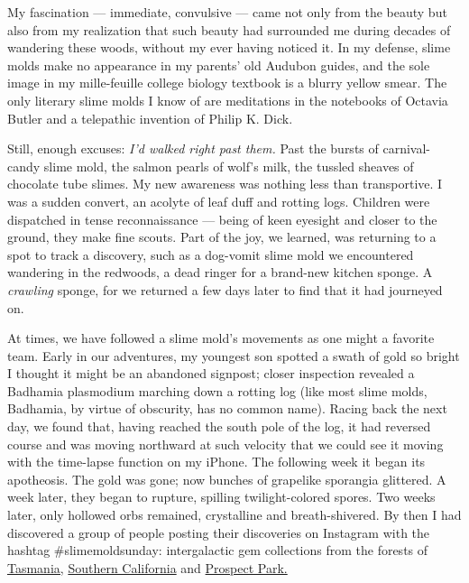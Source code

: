 My fascination --- immediate, convulsive --- came not only from the
beauty but also from my realization that such beauty had surrounded me
during decades of wandering these woods, without my ever having noticed
it. In my defense, slime molds make no appearance in my parents' old
Audubon guides, and the sole image in my mille-feuille college biology
textbook is a blurry yellow smear. The only literary slime molds I know
of are meditations in the notebooks of Octavia Butler and a telepathic
invention of Philip K. Dick.

Still, enough excuses: \emph{I'd walked right past them.} Past the
bursts of carnival-candy slime mold, the salmon pearls of wolf's milk,
the tussled sheaves of chocolate tube slimes. My new awareness was
nothing less than transportive. I was a sudden convert, an acolyte of
leaf duff and rotting logs. Children were dispatched in tense
reconnaissance --- being of keen eyesight and closer to the ground, they
make fine scouts. Part of the joy, we learned, was returning to a spot
to track a discovery, such as a dog-vomit slime mold we encountered
wandering in the redwoods, a dead ringer for a brand-new kitchen sponge.
A \emph{crawling} sponge, for we returned a few days later to find that
it had journeyed on.

At times, we have followed a slime mold's movements as one might a
favorite team. Early in our adventures, my youngest son spotted a swath
of gold so bright I thought it might be an abandoned signpost; closer
inspection revealed a Badhamia plasmodium marching down a rotting log
(like most slime molds, Badhamia, by virtue of obscurity, has no common
name). Racing back the next day, we found that, having reached the south
pole of the log, it had reversed course and was moving northward at such
velocity that we could see it moving with the time-lapse function on my
iPhone. The following week it began its apotheosis. The gold was gone;
now bunches of grapelike sporangia glittered. A week later, they began
to rupture, spilling twilight-colored spores. Two weeks later, only
hollowed orbs remained, crystalline and breath-shivered. By then I had
discovered a group of people posting their discoveries on Instagram with
the hashtag \#slimemoldsunday: intergalactic gem collections from the
forests of
\href{https://www.instagram.com/sarah.lloyd.tasmania/?hl=en}{Tasmania,}
\href{https://www.instagram.com/sir.myxo.lot/?hl=en}{Southern
California} and
\href{https://www.instagram.com/nycslimemolds/?hl=en}{Prospect Park.}

\href{https://www.nytimes3xbfgragh.onion/news-event/coronavirus?action=click\&pgtype=Article\&state=default\&region=MAIN_CONTENT_3\&context=storylines_faq}{}

